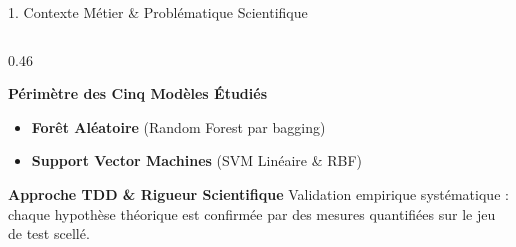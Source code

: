 \documentclass[aspectratio=169,10pt]{beamer}
\begin{document}
\begin{frame}{1. Contexte Métier \& Problématique Scientifique}
\begin{columns}[T]
\begin{column}{0.46\textwidth}
\begin{block}{\textbf{Périmètre des Cinq Modèles Étudiés}}
\begin{itemize}
                    \item \textbf{Forêt Aléatoire} (Random Forest par bagging)
                    \item \textbf{Support Vector Machines} (SVM Linéaire \& RBF)
                \end{itemize}
            \end{block}
            \vspace{0.15cm}
            \begin{exampleblock}{\textbf{Approche TDD \& Rigueur Scientifique}}
                \footnotesize Validation empirique systématique : chaque hypothèse théorique est confirmée par des mesures quantifiées sur le jeu de test scellé.
            \end{exampleblock}
        \end{column}
    \end{columns}
\end{frame}
\end{document}
